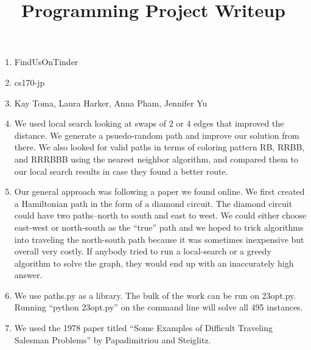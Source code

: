 \documentclass{article}
\begin{document}
\title{Programming Project Writeup}

\maketitle

\begin{enumerate}
\item FindUsOnTinder
\item cs170-jp
\item Kay Toma, Laura Harker, Anna Pham, Jennifer Yu
\item We used local search looking at swaps of 2 or 4 edges that improved the distance. We generate a psuedo-random path and improve our solution from there. We also looked for valid paths in terms of coloring pattern RB, RRBB, and RRRBBB using the nearest neighbor algorithm, and compared them to our local search results in case they found a better route.
\item Our general approach was following a paper we found online. We first created a Hamiltonian path in the form of a diamond circuit. The diamond circuit could have two paths--north to south and east to west. We could either choose east-west or north-south as the ``true'' path and we hoped to trick algorithms into traveling the north-south path because it was sometimes inexpensive but overall very costly. If anybody tried to run a local-search or a greedy algorithm to solve the graph, they would end up with an inaccurately high answer. 
\item We use paths.py as a library. The bulk of the work can be run on 23opt.py. Running ``python 23opt.py'' on the command line will solve all 495 instances. 
\item We used the 1978 paper titled ``Some Examples of Difficult Traveling Salesman Problems'' by Papadimitriou and Steiglitz. 
\end{enumerate}
\end{document}

